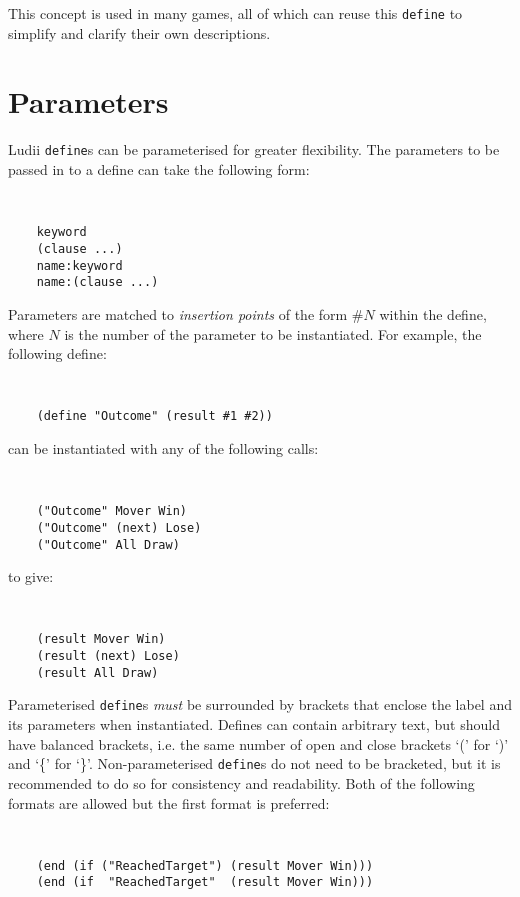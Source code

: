 This concept is used in many games, all of which can reuse this {\tt define} to simplify and clarify their own descriptions.


\section{Parameters}

Ludii {\tt define}s can be parameterised for greater flexibility. 
The parameters to be passed in to a define can take the following form:

{\tt
\begin{verbatim}
    keyword
    (clause ...)
    name:keyword
    name:(clause ...)
\end{verbatim}
}

Parameters are matched to {\it insertion points} of the form $\#N$ within the define, where $N$ is the number of the parameter to be instantiated. 
For example, the following define:

{\tt
\begin{verbatim}
    (define "Outcome" (result #1 #2))
\end{verbatim}
}

\noindent
can be instantiated with any of the following calls:

{\tt
\begin{verbatim}
    ("Outcome" Mover Win)    
    ("Outcome" (next) Lose)  
    ("Outcome" All Draw)    
\end{verbatim}
}

\noindent
to give:

{\tt
\begin{verbatim}
    (result Mover Win)    
    (result (next) Lose)  
    (result All Draw)    
\end{verbatim}
}

Parameterised {\tt define}s {\it must} be surrounded by brackets that enclose the label and its parameters when instantiated. 
Defines can contain arbitrary text, but should have balanced brackets, i.e. the same number of open and close brackets `(' for `)' and `\{' for `\}'. 
Non-parameterised {\tt define}s do not need to be bracketed, but it is recommended to do so for consistency and readability. 
Both of the following formats are allowed but the first format is preferred:

{\tt
\begin{verbatim}
    (end (if ("ReachedTarget") (result Mover Win)))
    (end (if  "ReachedTarget"  (result Mover Win)))
\end{verbatim}
}

